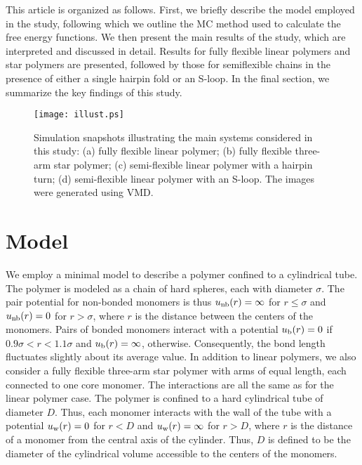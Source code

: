 \documentclass[journal=mamobx,manuscript=article,layout=twocolumn]{achemso}
\begin{document}
This article is organized as follows. First, we briefly describe the
model employed in the study, following which we outline the MC method used to
calculate the free energy functions. We then present the main results
of the study, which are interpreted and discussed in detail. Results for 
fully flexible linear polymers and star polymers are presented, followed by those for
semiflexible chains in the presence of either a single hairpin fold or an S-loop.
In the final section, we summarize the key findings of this study.

\begin{figure}[!ht]
\begin{center}
\texttt{[image: illust.ps]}
\end{center}
\caption{
Simulation snapshots illustrating the main systems considered in this study: (a) fully
flexible linear polymer; (b) fully flexible three-arm star polymer; (c) semi-flexible
linear polymer with a hairpin turn; (d) semi-flexible linear polymer with an S-loop.
The images were generated using VMD.\cite{HUMP96}
}
\label{fig:illust}
\end{figure}


\section{Model}
\label{sec:model}

We employ a minimal model to describe a polymer confined to a cylindrical tube. The
polymer is modeled as a chain of hard spheres, each with diameter $\sigma$.  The pair 
potential for non-bonded monomers is thus $u_{\rm{nb}}(r)=\infty$ for $r\leq\sigma$ 
and $u_{\rm{nb}}(r)=0$ for $r>\sigma$, where $r$ is the distance between the centers of 
the monomers. Pairs of bonded monomers interact with a potential $u_{\rm{b}}(r)= 0$ if 
$0.9\sigma<r<1.1\sigma$ and $u_{\rm{b}}(r)= \infty$, otherwise.  Consequently, the bond 
length fluctuates slightly about its average value. In addition to linear polymers,
we also consider a fully flexible three-arm star polymer with arms of equal length,
each connected to one core monomer. The interactions are all the same as for the linear
polymer case.  The polymer is confined to a 
hard cylindrical tube of diameter $D$. Thus, each monomer interacts with the wall of the 
tube with a potential $u_{\rm w}(r) = 0$ for $r<D$ and $u_{\rm w}(r) = \infty$ for $r>D$,
where $r$ is the distance of a monomer from the central axis of the cylinder. Thus, $D$ 
is defined to be the diameter of the cylindrical volume accessible to the centers of the 
monomers.
\end{document}
